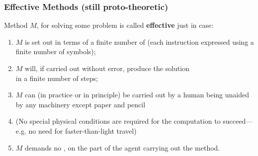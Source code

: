 \begin{frame}
\frametitle{Effective Methods (still proto-theoretic)}

Method $M$, for solving some problem is called \textbf{effective} just in case:

\begin{enumerate}[<+->]

\item $M$ is set out in terms of a \textcolor{highlightA}{finite number} of  (each instruction expressed using a \textcolor{highlightA}{finite number} of symbols);
\item $M$ will, if carried out \textcolor{OGlyallpink}{without error}, produce the solution \\ in a \textcolor{highlightA}{finite number} of steps;
\item $M$ can (in practice or in principle) be carried out by a human being unaided by any machinery except paper and pencil 
\item[] (No special physical conditions are required for the computation to succeed---e.g. no need for faster-than-light travel) 
\item $M$ demands no , on the part of the agent carrying out the method.


\end{enumerate}
\end{frame}

